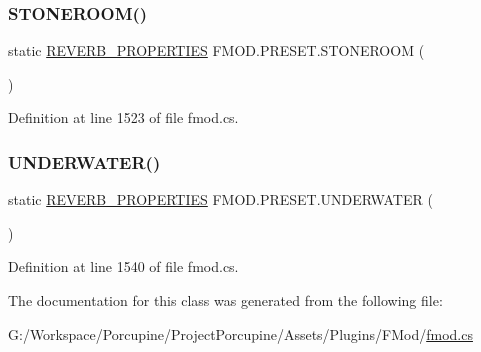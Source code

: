 \subsubsection{\texorpdfstring{S\+T\+O\+N\+E\+R\+O\+O\+M()}{STONEROOM()}}
{\footnotesize\ttfamily static \hyperlink{struct_f_m_o_d_1_1_r_e_v_e_r_b___p_r_o_p_e_r_t_i_e_s}{R\+E\+V\+E\+R\+B\+\_\+\+P\+R\+O\+P\+E\+R\+T\+I\+ES} F\+M\+O\+D.\+P\+R\+E\+S\+E\+T.\+S\+T\+O\+N\+E\+R\+O\+OM (\begin{DoxyParamCaption}{ }\end{DoxyParamCaption})\hspace{0.3cm}{\ttfamily [static]}}



Definition at line 1523 of file fmod.\+cs.

\mbox{\label{class_f_m_o_d_1_1_p_r_e_s_e_t_aaba513a279a8993c88ddf076ce2dabcf}} 
\subsubsection{\texorpdfstring{U\+N\+D\+E\+R\+W\+A\+T\+E\+R()}{UNDERWATER()}}
{\footnotesize\ttfamily static \hyperlink{struct_f_m_o_d_1_1_r_e_v_e_r_b___p_r_o_p_e_r_t_i_e_s}{R\+E\+V\+E\+R\+B\+\_\+\+P\+R\+O\+P\+E\+R\+T\+I\+ES} F\+M\+O\+D.\+P\+R\+E\+S\+E\+T.\+U\+N\+D\+E\+R\+W\+A\+T\+ER (\begin{DoxyParamCaption}{ }\end{DoxyParamCaption})\hspace{0.3cm}{\ttfamily [static]}}



Definition at line 1540 of file fmod.\+cs.



The documentation for this class was generated from the following file\+:\begin{DoxyCompactItemize}
\item 
G\+:/\+Workspace/\+Porcupine/\+Project\+Porcupine/\+Assets/\+Plugins/\+F\+Mod/\hyperlink{fmod_8cs}{fmod.\+cs}\end{DoxyCompactItemize}
